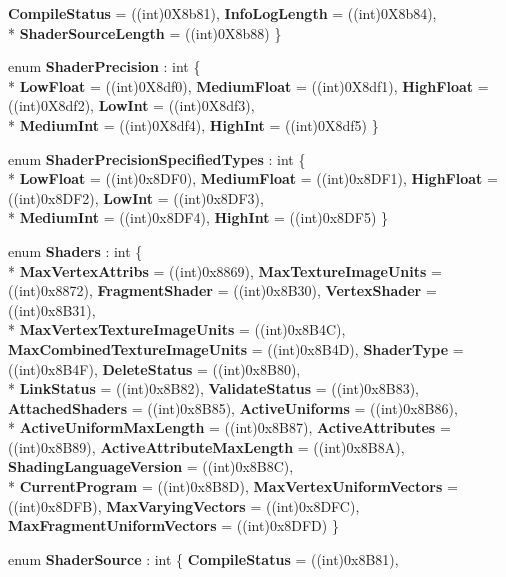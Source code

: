 \begin{DoxyCompactItemize}
{\bfseries Compile\-Status} = ((int)0\-X8b81), 
{\bfseries Info\-Log\-Length} = ((int)0\-X8b84), 
\\*
{\bfseries Shader\-Source\-Length} = ((int)0\-X8b88)
 \}
\item 
enum {\bfseries Shader\-Precision} \-: int \{ \\*
{\bfseries Low\-Float} = ((int)0\-X8df0), 
{\bfseries Medium\-Float} = ((int)0\-X8df1), 
{\bfseries High\-Float} = ((int)0\-X8df2), 
{\bfseries Low\-Int} = ((int)0\-X8df3), 
\\*
{\bfseries Medium\-Int} = ((int)0\-X8df4), 
{\bfseries High\-Int} = ((int)0\-X8df5)
 \}
\item 
enum {\bfseries Shader\-Precision\-Specified\-Types} \-: int \{ \\*
{\bfseries Low\-Float} = ((int)0x8\-D\-F0), 
{\bfseries Medium\-Float} = ((int)0x8\-D\-F1), 
{\bfseries High\-Float} = ((int)0x8\-D\-F2), 
{\bfseries Low\-Int} = ((int)0x8\-D\-F3), 
\\*
{\bfseries Medium\-Int} = ((int)0x8\-D\-F4), 
{\bfseries High\-Int} = ((int)0x8\-D\-F5)
 \}
\item 
enum {\bfseries Shaders} \-: int \{ \\*
{\bfseries Max\-Vertex\-Attribs} = ((int)0x8869), 
{\bfseries Max\-Texture\-Image\-Units} = ((int)0x8872), 
{\bfseries Fragment\-Shader} = ((int)0x8\-B30), 
{\bfseries Vertex\-Shader} = ((int)0x8\-B31), 
\\*
{\bfseries Max\-Vertex\-Texture\-Image\-Units} = ((int)0x8\-B4\-C), 
{\bfseries Max\-Combined\-Texture\-Image\-Units} = ((int)0x8\-B4\-D), 
{\bfseries Shader\-Type} = ((int)0x8\-B4\-F), 
{\bfseries Delete\-Status} = ((int)0x8\-B80), 
\\*
{\bfseries Link\-Status} = ((int)0x8\-B82), 
{\bfseries Validate\-Status} = ((int)0x8\-B83), 
{\bfseries Attached\-Shaders} = ((int)0x8\-B85), 
{\bfseries Active\-Uniforms} = ((int)0x8\-B86), 
\\*
{\bfseries Active\-Uniform\-Max\-Length} = ((int)0x8\-B87), 
{\bfseries Active\-Attributes} = ((int)0x8\-B89), 
{\bfseries Active\-Attribute\-Max\-Length} = ((int)0x8\-B8\-A), 
{\bfseries Shading\-Language\-Version} = ((int)0x8\-B8\-C), 
\\*
{\bfseries Current\-Program} = ((int)0x8\-B8\-D), 
{\bfseries Max\-Vertex\-Uniform\-Vectors} = ((int)0x8\-D\-F\-B), 
{\bfseries Max\-Varying\-Vectors} = ((int)0x8\-D\-F\-C), 
{\bfseries Max\-Fragment\-Uniform\-Vectors} = ((int)0x8\-D\-F\-D)
 \}
\item 
enum {\bfseries Shader\-Source} \-: int \{ {\bfseries Compile\-Status} = ((int)0x8\-B81), 

\end{DoxyCompactItemize}
